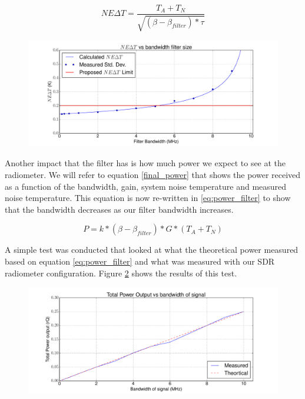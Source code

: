 \begin{equation} \label{NEAT_filter}
NE\Delta T=\frac{T_{A}+T_{N}}{\sqrt{(\beta - \beta_{filter}) * \tau}}
\end{equation}

\begin{figure}[h!tb] \centering

\includegraphics[width=\textwidth]{Experiments/Exp5/neatvsbw_plot.pdf}

\label{neatvsbw}
\end{figure}

Another impact that the filter has is how much power we expect to see at the radiometer.  We will refer to equation \ref{final_power} that shows the power received as a function of the bandwidth, gain, system noise temperature and measured noise temperature.  This equation is now re-written in \ref{eq:power_filter} to show that the bandwidth decreases as our filter bandwidth increases.

\begin{equation} \label{eq:power_filter}
P=k*(\beta - \beta_{filter})*G*(T_{A}+T_{N})
\end{equation}

A simple test was conducted that looked at what the theoretical power measured based on equation \ref{eq:power_filter} and what was measured with our SDR radiometer configuration.  Figure \ref{powervsbw} shows the results of this test.

\begin{figure}[h!tb] \centering

\includegraphics[width=\textwidth]{Experiments/Exp5/combined_plot.pdf}

\label{powervsbw}
\end{figure}

